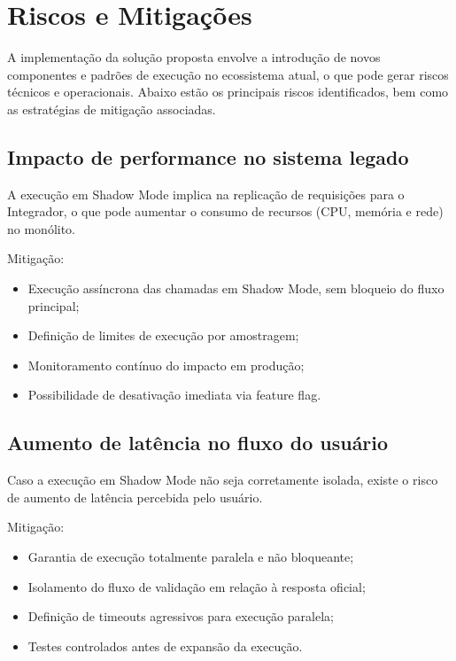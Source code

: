 \section{Riscos e Mitigações}

A implementação da solução proposta envolve a introdução de novos componentes e padrões de execução no ecossistema atual, o que pode gerar riscos técnicos e operacionais. Abaixo estão os principais riscos identificados, bem como as estratégias de mitigação associadas.

\subsection{Impacto de performance no sistema legado}

A execução em Shadow Mode implica na replicação de requisições para o Integrador, o que pode aumentar o consumo de recursos (CPU, memória e rede) no monólito.

\vspace{0.5em}
Mitigação:

\begin{itemize}
    \item Execução assíncrona das chamadas em Shadow Mode, sem bloqueio do fluxo principal;
    \item Definição de limites de execução por amostragem;
    \item Monitoramento contínuo do impacto em produção;
    \item Possibilidade de desativação imediata via feature flag.
\end{itemize}

\subsection{Aumento de latência no fluxo do usuário}

Caso a execução em Shadow Mode não seja corretamente isolada, existe o risco de aumento de latência percebida pelo usuário.

\vspace{0.5em}
Mitigação:

\begin{itemize}
    \item Garantia de execução totalmente paralela e não bloqueante;
    \item Isolamento do fluxo de validação em relação à resposta oficial;
    \item Definição de timeouts agressivos para execução paralela;
    \item Testes controlados antes de expansão da execução.
\end{itemize}

